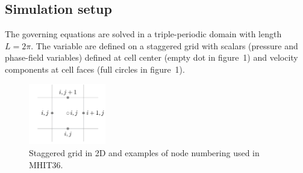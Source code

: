 \documentclass[11pt]{article}
\begin{document}
\subsection{Simulation setup}
The governing equations are solved in a triple-periodic domain with length $L=2 \pi$.
The variable are defined on a staggered grid with scalars (pressure and phase-field variables) defined at cell center (empty dot in figure~1) and velocity components at cell faces (full circles in figure~1).






\begin{figure}[!t]
\centering
    \includegraphics[width=0.3\textwidth]{staggered_2.png} 
    \caption{Staggered grid in 2D and examples of node numbering used in MHIT36.}
    \label{fig1}
\end{figure}
\end{document}
